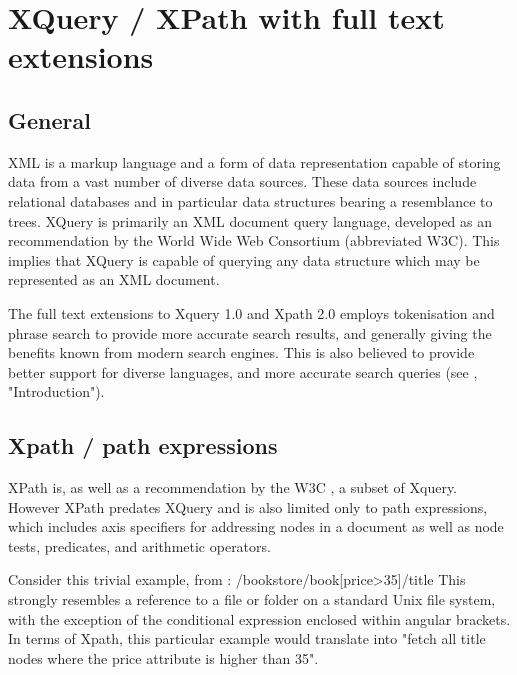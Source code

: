 \section{XQuery / XPath with full text extensions}
\subsection{General}
XML is a markup language and a form of data representation capable of storing data from a vast number of diverse data sources. These data sources include relational databases and in particular data structures bearing a resemblance to trees. XQuery is primarily an XML document query language, developed as an recommendation by the World Wide Web Consortium\cite{W3C00} (abbreviated W3C). This implies that XQuery is capable of querying any data structure which may be represented as an XML document.

The full text extensions to Xquery 1.0 and Xpath 2.0 employs tokenisation and phrase search to provide more accurate search results, and generally giving the benefits known from modern search engines. This is also believed to provide better support for diverse languages, and more accurate search queries (see \cite{W3C02}, "Introduction").

\subsection{Xpath / path expressions}
XPath is, as well as a recommendation by the W3C \cite{w3c01}, a subset of Xquery. However XPath predates XQuery and is also limited only to path expressions, which includes axis specifiers for addressing nodes in a document as well as node tests, predicates, and arithmetic operators.

Consider this trivial example, from \cite{w3s00}:
/bookstore/book[price>35]/title
This strongly resembles a reference to a file or folder on a standard Unix file system, with the exception of the conditional expression enclosed within angular brackets. In terms of Xpath, this particular example would translate into "fetch all title nodes where the price attribute is higher than 35".

